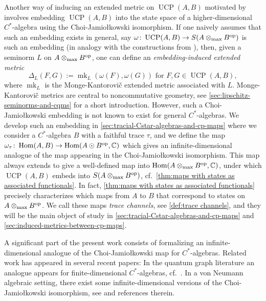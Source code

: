 \documentclass[11pt, a4paper, oneside, final, reqno]{amsart}
\newcommand{\bbC}{\mathbb{C}}
\newcommand{\Hom}{\operatorname{Hom}}
\newcommand{\UCP}{\operatorname{UCP}}
\newcommand{\mk}{\operatorname{mk}}
\theoremstyle{definition}
\theoremstyle{plain}
\theoremstyle{remark}
\numberwithin{equation}{section}
\begin{document}
Another way of inducing an extended metric on $\UCP(A,B)$ motivated by \cite{Gilchrist} involves embedding $\UCP(A,B)$ into the state space of a higher-dimensional $C^*$-algebra using the Choi-Jamio\l{}kowski isomorphism. If one naively assumes that such an embedding exists in general, say $\omega \colon \UCP(A,B) \to S(A \otimes_{\rm max} B^{\rm op})$ is such an embedding (in analogy with the constructions from \cite{Gilchrist, BorovykVellambi25}), then, given a seminorm $L$ on $A \otimes_{\rm max} B^{\rm op}$, one can define an \emph{embedding-induced extended metric} 
\begin{equation*}
    \Delta_{L}(F,G) := \mk_L(\omega(F),\omega(G))\text{ for }F,G\in \UCP(A,B),
\end{equation*}  
where $\mk_L$ is the Monge-Kantorovi\v{c} extended metric associated with $L$. Monge-Kantorovi\v{c} metrics are central to noncommutative geometry, see \cref{sec:lipschitz-seminorms-and-cqms} for a short introduction. However, such a Choi-Jamio\l{}kowski embedding is not known to exist for general $C^*$-algebras. We develop such an embedding in \cref{sec:tracial-Cstar-algebras-and-cp-maps} where we consider a $C^*$-algebra $B$ with a faithful trace $\tau$, and we define the map $\omega_\tau \colon \Hom(A,B) \to \Hom(A \odot B^{\rm op},\bbC)$ which gives an infinite-dimensional analogue of the map appearing in the Choi-Jamio\l{}kowski isomorphism. This map always extends to give a well-defined map into $\Hom(A \otimes_{\rm max} B^{\rm op},\bbC)$, under which $\UCP(A,B)$ embeds into $S(A \otimes_{\rm max} B^{\rm op})$, cf.~\cref{thm:maps with states as associated functionals}. In fact, \cref{thm:maps with states as associated functionals} precisely characterizes which maps from $A$ to $B$ that correspond to states on $A \otimes_{\rm max} B^{\rm op}$. We call these maps \emph{trace channels}, see \cref{def:trace channels}, and they will be the main object of study in \cref{sec:tracial-Cstar-algebras-and-cp-maps} and \cref{sec:induced-metrics-between-cp-maps}. 

A significant part of the present work consists of formalizing an infinite-dimensional analogue of the Choi-Jamio\l{}kowski map for $C^*$-algebras. Related work has appeared in several recent papers: In the quantum graph literature an analogue appears for finite-dimensional $C^*$-algebras, cf.~\cite{Wasilewski2024,CourtneyGanesanWasilewski25}. In a von Neumann algebraic setting, there exist some infinite-dimensional versions of the Choi-Jamio\l{}kowski isomorphism, see \cite{Haap2021, HKS2024} and references therein.
\end{document}
